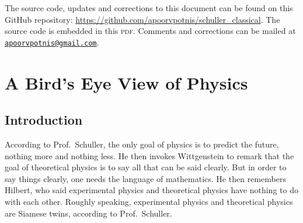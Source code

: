 \documentclass[a4 paper, 12pt]{book}
\theoremstyle{definition}
\begin{document}
    The source code, updates and corrections to this document can be found on this GitHub repository: \url{https://github.com/apoorvpotnis/schuller_classical}. The source code is embedded in this \textsc{pdf}. Comments and corrections can be mailed at \href{mailto:apoorvpotnis@gmail.com}{\texttt{apoorvpotnis@gmail.com}}.
    \clearpage
    

    \hypertarget{Contents}{}
    \tableofcontents
    \mainmatter

    \chapter{A Bird's Eye View of Physics}

    \section{Introduction}

    According to Prof.\ Schuller, the only goal of physics is to predict the future, nothing more and nothing less. He then invokes Wittgenstein to remark that the goal of theoretical physics is to say all that can be said clearly. But in order to say things clearly, one needs the language of mathematics. He then remembers Hilbert, who said experimental physics and theoretical physics have nothing to do with each other. Roughly speaking, experimental physics and theoretical physics are Siamese twins, according to Prof.\ Schuller.
\end{document}
